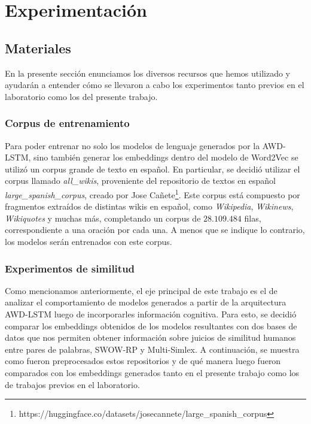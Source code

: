 \chapter{Experimentación}

\section{Materiales}

En la presente sección enunciamos los diversos recursos que hemos utilizado y ayudarán a entender cómo se llevaron a cabo los experimentos tanto previos en el laboratorio como los del presente trabajo.

\subsection{Corpus de entrenamiento}

Para poder entrenar no solo los modelos de lenguaje generados por la AWD-LSTM, 
sino también generar los embeddings dentro del modelo de Word2Vec se utilizó un 
corpus grande de texto en español. En particular, se decidió utilizar el corpus 
llamado \textit{all\_wikis}, proveniente del repositorio de textos en español 
\textit{large\_spanish\_corpus}, creado por Jose Cañete\footnote{https://huggingface.co/datasets/josecannete/large\_spanish\_corpus}.
Este corpus está compuesto por fragmentos extraídos de distintas wikis en español, 
como \textit{Wikipedia}, \textit{Wikinews}, \textit{Wikiquotes} y muchas más, completando un corpus de $28.109.484$ filas, 
correspondiente a una oración por cada una. A menos que se indique lo contrario, 
los modelos serán entrenados con este corpus.

\subsection{Experimentos de similitud}

Como mencionamos anteriormente, el eje principal de este trabajo es el de analizar el 
comportamiento de modelos generados a partir de la arquitectura AWD-LSTM luego de incorporarles 
información cognitiva. Para esto, se decidió comparar los embeddings obtenidos de los modelos 
resultantes con dos bases de datos que nos permiten obtener información sobre juicios de similitud 
humanos entre pares de palabras, SWOW-RP y Multi-Simlex. A continuación, se muestra como fueron 
preprocesados estos repositorios y de qué manera luego fueron comparados con los embeddings 
generados tanto en el presente trabajo como los de trabajos previos en el laboratorio.


